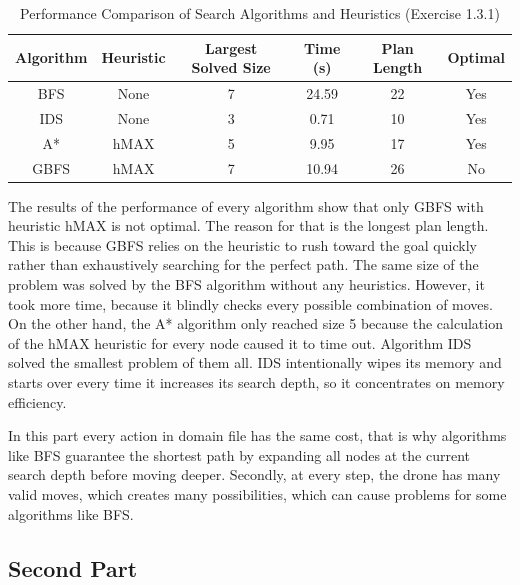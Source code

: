 \documentclass{article}
\begin{document}
\begin{table}[H]
\centering
\begin{tabular}{|c|c|c|c|c|c|}
\hline
\textbf{Algorithm} & \textbf{Heuristic} & \textbf{Largest Solved Size} & \textbf{Time (s)} & \textbf{Plan Length} & \textbf{Optimal} \\ \hline
BFS & None & 7 & 24.59 & 22 & Yes \\ \hline
IDS & None & 3 & 0.71 & 10 & Yes \\ \hline
A* & hMAX & 5 & 9.95 & 17 & Yes \\ \hline
GBFS & hMAX & 7 & 10.94 & 26 & No \\ \hline
\end{tabular}
\caption{Performance Comparison of Search Algorithms and Heuristics (Exercise 1.3.1)}
\label{tab:results_1_3_1}
\end{table}
The results of the performance of every algorithm show that only GBFS with heuristic hMAX is not optimal. The reason for that is the longest plan length. This is because GBFS relies on the heuristic to rush toward the goal quickly rather than exhaustively searching for the perfect path. The same size of the problem was solved by the BFS algorithm without any heuristics. However, it took more time, because it blindly checks every possible combination of moves. On the other hand, the A* algorithm only reached size 5 because the calculation of the hMAX heuristic for every node caused it to time out. Algorithm IDS solved the smallest problem of them all. IDS intentionally wipes its memory and starts over every time it increases its search depth, so it concentrates on memory efficiency.

In this part every action in domain file has the same cost, that is why algorithms like BFS guarantee the shortest path by expanding all nodes at the current search depth before moving deeper. Secondly, at every step, the drone has many valid moves, which creates many possibilities, which can  cause problems for some algorithms like BFS.
\subsection{Second Part}
\end{document}
